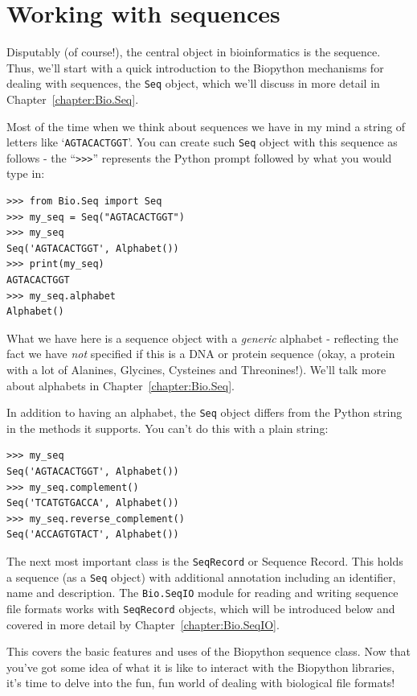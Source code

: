 \documentclass{report}
\begin{document}
\section{Working with sequences}
\label{sec:sequences}

Disputably (of course!), the central object in bioinformatics is the sequence. Thus, we'll start with a quick introduction to the Biopython mechanisms for dealing with sequences, the \verb|Seq| object, which we'll discuss in more detail in Chapter~\ref{chapter:Bio.Seq}.

Most of the time when we think about sequences we have in my mind a string of letters like `\verb|AGTACACTGGT|'. You can create such \verb|Seq| object with this sequence as follows - the ``\verb+>>>+'' represents the Python prompt followed by what you would type in:

\begin{verbatim}
>>> from Bio.Seq import Seq
>>> my_seq = Seq("AGTACACTGGT")
>>> my_seq
Seq('AGTACACTGGT', Alphabet())
>>> print(my_seq)
AGTACACTGGT
>>> my_seq.alphabet
Alphabet()
\end{verbatim}

What we have here is a sequence object with a \emph{generic} alphabet - reflecting the fact we have \emph{not} specified if this is a DNA or protein sequence (okay, a protein with a lot of Alanines, Glycines, Cysteines and Threonines!).  We'll talk more about alphabets in Chapter~\ref{chapter:Bio.Seq}.

In addition to having an alphabet, the \verb|Seq| object differs from the Python string in the methods it supports.  You can't do this with a plain string:

\begin{verbatim}
>>> my_seq
Seq('AGTACACTGGT', Alphabet())
>>> my_seq.complement()
Seq('TCATGTGACCA', Alphabet())
>>> my_seq.reverse_complement()
Seq('ACCAGTGTACT', Alphabet())
\end{verbatim}

The next most important class is the \verb|SeqRecord| or Sequence Record.  This holds a sequence (as a \verb|Seq| object) with additional annotation including an identifier, name and description.  The \verb|Bio.SeqIO| module for reading and writing sequence file formats works with \verb|SeqRecord| objects, which will be introduced below and covered in more detail by Chapter~\ref{chapter:Bio.SeqIO}.

This covers the basic features and uses of the Biopython sequence class.
Now that you've got some idea of what it is like to interact with the Biopython libraries, it's time to delve into the fun, fun world of dealing with biological file formats!
\end{document}
